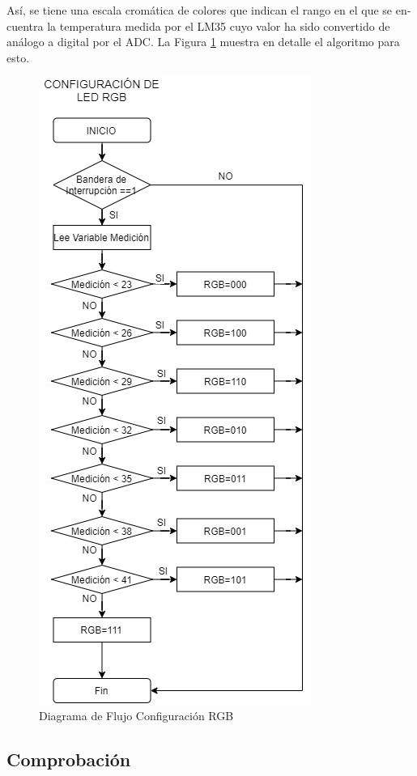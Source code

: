 \documentclass[journal]{IEEEtran}
\begin{document}
\begin{otherlanguage}{spanish}
Así, se tiene una escala cromática de colores que indican el rango en el que se encuentra la temperatura medida por el LM35 cuyo valor ha sido convertido de análogo a digital por el ADC. La Figura \ref{DDF_RGB} muestra en detalle el algoritmo para esto.

\begin{figure}[H]
    \centering
    \includegraphics[scale=.5]{Imágenes/Practica 5.3.jpg}
    \caption{Diagrama de Flujo Configuración RGB}
    \label{DDF_RGB}
\end{figure}

\subsection{Comprobación}


\end{otherlanguage}
\end{document}
